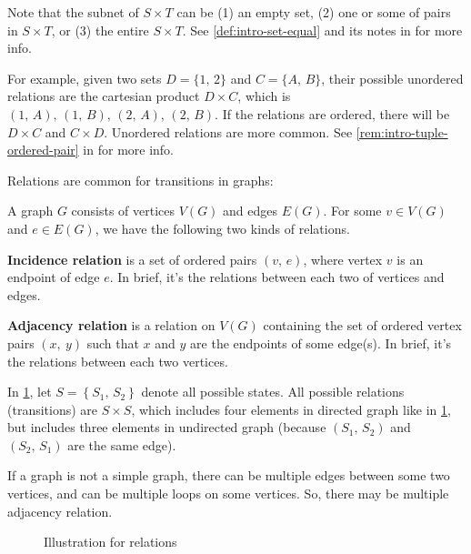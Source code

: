 \documentclass[../src/handouts/main.tex]{subfiles}
\begin{document}
Note that the subnet of $S \times T$ can be (1) an empty set, (2) one or some of pairs in $S \times T$, or (3) the entire $S \times T$. See \cref{def:intro-set-equal} and its notes in  for more info.

For example, given two sets $D = \{ 1,\, 2\}$ and $C = \{ A,\, B \}$, their possible unordered relations are the cartesian product $D \times C$, which is $(1,\, A),\, (1,\, B),\, (2,\, A),\, (2,\, B)$. If the relations are ordered, there will be $D \times C$ and $C \times D$. Unordered relations are more common. See \cref{rem:intro-tuple-ordered-pair} in  for more info.

Relations are common for transitions in graphs:
\begin{enumerate*}
  \item A graph $G$ consists of vertices $V(G)$ and edges $E(G)$. For some $v \in V(G)$ and $e \in E(G)$, we have the following two kinds of relations.
  \item \textbf{Incidence relation} is a set of ordered pairs $(v,\, e)$, where vertex $v$ is an endpoint of edge $e$. In brief, it's the relations between each two of vertices and edges.
  \item \textbf{Adjacency relation} is a relation on $V(G)$ containing the set of ordered vertex pairs $(x,\ y)$ such that $x$ and $y$ are the endpoints of some edge(s). In brief, it's the relations between each two vertices.
  \item In \cref{fig:intro-relation}, let $S = \left\{ S_1,\, S_2 \right\}$ denote all possible states. All possible relations (transitions) are $S \times S$, which includes four elements in directed graph like in \cref{fig:intro-relation}, but includes three elements in undirected graph (because $(S_1,\, S_2)$ and $(S_2,\, S_1)$ are the same edge).
  \item If a graph is not a simple graph, there can be multiple edges between some two vertices, and can be multiple loops on some vertices. So, there may be multiple adjacency relation.
\end{enumerate*}

\begin{figure}[htbp]
  \centering
  \caption{Illustration for relations}
  \label{fig:intro-relation}
\end{figure}
\end{document}
